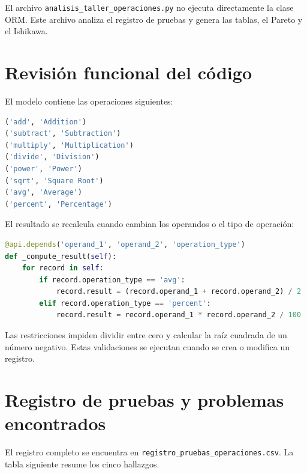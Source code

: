 \documentclass{article}
\begin{document}
El archivo \texttt{analisis\_taller\_operaciones.py} no ejecuta directamente la clase ORM. Este archivo analiza el registro de pruebas y genera las tablas, el Pareto y el Ishikawa.

\section{Revisión funcional del código}
El modelo contiene las operaciones siguientes:
\begin{lstlisting}[language=Python]
('add', 'Addition')
('subtract', 'Subtraction')
('multiply', 'Multiplication')
('divide', 'Division')
('power', 'Power')
('sqrt', 'Square Root')
('avg', 'Average')
('percent', 'Percentage')
\end{lstlisting}

El resultado se recalcula cuando cambian los operandos o el tipo de operación:
\begin{lstlisting}[language=Python]
@api.depends('operand_1', 'operand_2', 'operation_type')
def _compute_result(self):
    for record in self:
        if record.operation_type == 'avg':
            record.result = (record.operand_1 + record.operand_2) / 2
        elif record.operation_type == 'percent':
            record.result = record.operand_1 * record.operand_2 / 100
\end{lstlisting}

Las restricciones impiden dividir entre cero y calcular la raíz cuadrada de un número negativo. Estas validaciones se ejecutan cuando se crea o modifica un registro.

\section{Registro de pruebas y problemas encontrados}
El registro completo se encuentra en \texttt{registro\_pruebas\_operaciones.csv}. La tabla siguiente resume los cinco hallazgos.
\end{document}
